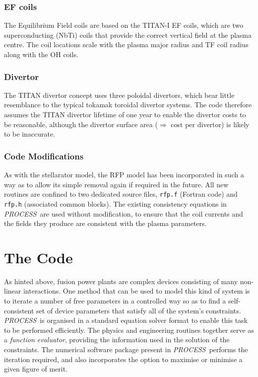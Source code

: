 \documentclass[11pt,a4paper]{report}
\newcommand{\PS}{\mbox{\it PROCESS\/ }}
\begin{document}
\subsubsection{EF coils}
The Equilibrium Field coils are based on the TITAN-I EF coils, which are two
superconducting (NbTi) coils that provide the correct vertical field at the
plasma centre. The coil locations scale with the plasma major radius and TF
coil radius along with the OH coils.

\subsubsection{Divertor}
The TITAN divertor concept uses three poloidal divertors, which bear little
resemblance to the typical tokamak toroidal divertor systems. The code
therefore assumes the TITAN divertor lifetime of one year to enable the
divertor costs to be reasonable, although the divertor surface area
($\Longrightarrow$ cost per divertor) is likely to be inaccurate.

\subsubsection{Code Modifications}
As with the stellarator model, the RFP model has been incorporated in such a
way as to allow its simple removal again if required in the future. All new
routines are confined to two dedicated source files, {\tt rfp.f} (Fortran
code) and {\tt rfp.h} (associated common blocks). The existing consistency
equations in \PS are used without modification, to ensure that the coil
currents and the fields they produce are consistent with the plasma
parameters.


\section{The Code}

As hinted above, fusion power plants are complex devices consisting of many
non-linear interactions. One method that can be used to model this kind of
system is to iterate a number of free parameters in a controlled way so as to
find a self-consistent set of device parameters that satisfy all of the
system's constraints. \PS is organised in a standard equation solver format to
enable this task to be performed efficiently. The physics and engineering
routines together serve as a {\it function evaluator}, providing the
information used in the solution of the constraints. The numerical software
package present in \PS performs the iteration required, and also incorporates
the option to maximise or minimise a given figure of merit.
\end{document}
